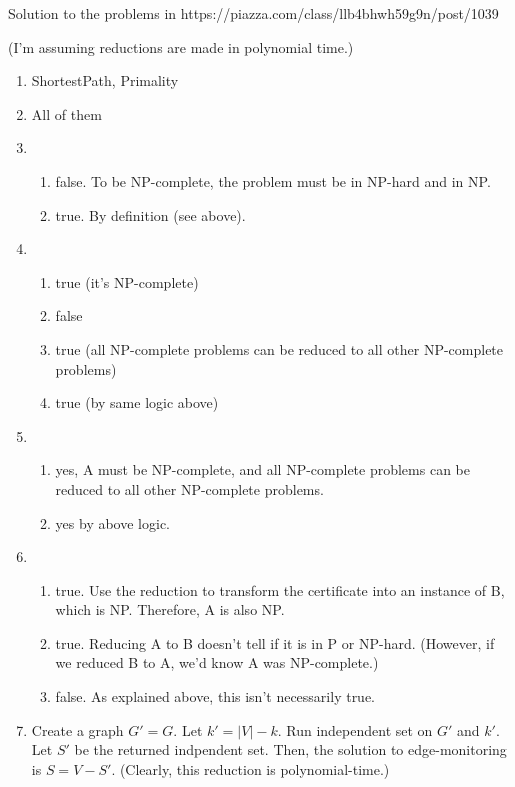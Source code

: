 \documentclass[11pt]{article}
\begin{document}
Solution to the problems in https://piazza.com/class/llb4bhwh59g9n/post/1039

(I'm assuming reductions are made in polynomial time.)

\begin{enumerate}
    \item ShortestPath, Primality
    \item All of them
    \item 
    \begin{enumerate}
        \item false. To be NP-complete, the problem must be in NP-hard and in NP.
        \item true. By definition (see above).
    \end{enumerate}
    \item 
    \begin{enumerate}
        \item true (it's NP-complete)
        \item false
        \item true (all NP-complete problems can be reduced to all other NP-complete problems)
        \item true (by same logic above)
    \end{enumerate}
    \item 
    \begin{enumerate}
        \item yes, A must be NP-complete, and all NP-complete problems can be reduced to all other NP-complete problems.
        \item yes by above logic.
    \end{enumerate}
    \item 
    \begin{enumerate}
        \item true. Use the reduction to transform the certificate into an instance of B, which is NP. Therefore, A is also NP.
        \item true. Reducing A to B doesn't tell if it is in P or NP-hard. (However, if we reduced B to A, we'd know A was NP-complete.)
        \item false. As explained above, this isn't necessarily true.
    \end{enumerate}
    \item Create a graph $G' = G$. Let $k' = |V| - k$. Run independent set on $G'$ and $k'$. Let $S'$ be the returned indpendent set. Then, the solution to edge-monitoring is $S = V - S'$. (Clearly, this reduction is polynomial-time.)


\end{enumerate}
\end{document}
